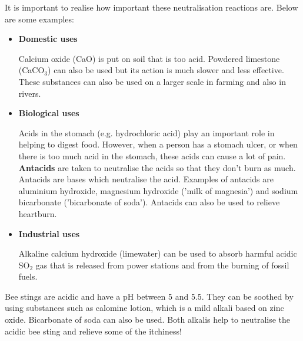 It is important to realise how important these neutralisation reactions are. Below are some examples:

\begin{itemize}
\item{\textbf{Domestic uses}

Calcium oxide (CaO) is put on soil that is too acid. Powdered limestone (CaCO$_{3}$) can also be used but its action is much slower and less effective. These substances can also be used on a larger scale in farming and also in rivers. }

\item{\textbf{Biological uses}

Acids in the stomach (e.g. hydrochloric acid) play an important role in helping to digest food. However, when a person has a stomach ulcer, or when there is too much acid in the stomach, these acids can cause a lot of pain. \textbf{Antacids} are taken to neutralise the acids so that they don't burn as much. Antacids are bases which neutralise the acid. Examples of antacids are aluminium hydroxide, magnesium hydroxide ('milk of magnesia') and sodium bicarbonate ('bicarbonate of soda'). Antacids can also be used to relieve heartburn.}

\item{\textbf{Industrial uses}

Alkaline calcium hydroxide (limewater) can be used to absorb harmful acidic SO$_{2}$ gas that is released from power stations and from the burning of fossil fuels.
}


\end{itemize}

\begin{IFact}{
Bee stings are acidic and have a pH between 5 and 5.5. They can be soothed by using substances such as calomine lotion, which is a mild alkali based on zinc oxide. Bicarbonate of soda can also be used. Both alkalis help to neutralise the acidic bee sting and relieve some of the itchiness!
}
\end{IFact}

